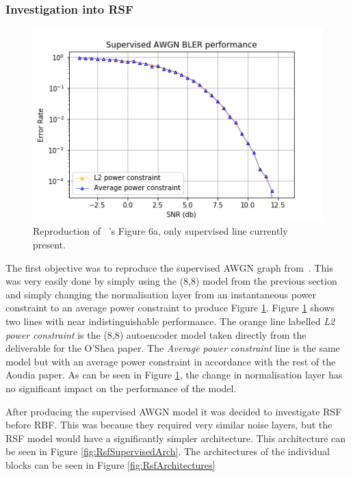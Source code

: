 \documentclass[12pt,onecolumn,letterpaper]{article}
\newcommand\genfigsize{0.5}
\begin{document}
\subsubsection{Investigation into RSF}
\label{sec:InvestigateRsf}

\begin{figure}
   \centering
   \includegraphics[width=\genfigsize\linewidth]{figures/aoudia_paper/awgn_supervised.png}
   \caption{Reproduction of ~\cite{Aoudia}'s Figure 6a, only supervised line currently present.}
   \label{fig:AwgnSupervised}
\end{figure}

The first objective was to reproduce the supervised AWGN graph from~\cite{Aoudia}. This was very easily done by simply using the (8,8) model from the previous section and simply changing the normalisation layer from an instantaneous power constraint to an average power constraint to produce Figure \ref{fig:AwgnSupervised}. Figure \ref{fig:AwgnSupervised} shows two lines with near indistinguishable performance. The orange line labelled \textit{L2 power constraint} is the (8,8) autoencoder model taken directly from the deliverable for the O'Shea paper. The \textit{Average power constraint} line is the same model but with an average power constraint in accordance with the rest of the Aoudia paper. As can be seen in Figure \ref{fig:AwgnSupervised}, the change in normalisation layer has no significant impact on the performance of the model. 

After producing the supervised AWGN model it was decided to investigate RSF before RBF. This was because they required very similar noise layers, but the RSF model would have a significantly simpler architecture. This architecture can be seen in Figure \ref{fig:RsfSupervisedArch}. The architectures of the individual blocks can be seen in Figure \ref{fig:RsfArchitectures}
\end{document}
